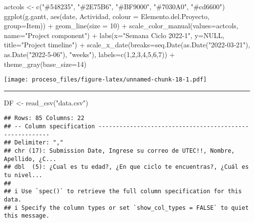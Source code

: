 \documentclass[
]{article}
\newenvironment{Shaded}{\begin{snugshade}}{\end{snugshade}}
\newcommand{\AttributeTok}[1]{\textcolor[rgb]{0.77,0.63,0.00}{#1}}
\newcommand{\ConstantTok}[1]{\textcolor[rgb]{0.00,0.00,0.00}{#1}}
\newcommand{\DecValTok}[1]{\textcolor[rgb]{0.00,0.00,0.81}{#1}}
\newcommand{\FunctionTok}[1]{\textcolor[rgb]{0.00,0.00,0.00}{#1}}
\newcommand{\NormalTok}[1]{#1}
\newcommand{\OtherTok}[1]{\textcolor[rgb]{0.56,0.35,0.01}{#1}}
\newcommand{\SpecialCharTok}[1]{\textcolor[rgb]{0.00,0.00,0.00}{#1}}
\newcommand{\StringTok}[1]{\textcolor[rgb]{0.31,0.60,0.02}{#1}}
\begin{document}
\begin{Shaded}
\begin{Highlighting}[]
\NormalTok{actcols }\OtherTok{\textless{}{-}} \FunctionTok{c}\NormalTok{(}\StringTok{"\#548235"}\NormalTok{, }\StringTok{"\#2E75B6"}\NormalTok{, }\StringTok{"\#BF9000"}\NormalTok{, }\StringTok{"\#7030A0"}\NormalTok{, }\StringTok{"\#cd6600"}\NormalTok{)}
\FunctionTok{ggplot}\NormalTok{(g.gantt, }\FunctionTok{aes}\NormalTok{(date, Actividad, }\AttributeTok{colour =}\NormalTok{ Elemento.del.Proyecto, }\AttributeTok{group=}\NormalTok{Item)) }\SpecialCharTok{+}
  \FunctionTok{geom\_line}\NormalTok{(}\AttributeTok{size =} \DecValTok{10}\NormalTok{) }\SpecialCharTok{+}
  \FunctionTok{scale\_color\_manual}\NormalTok{(}\AttributeTok{values=}\NormalTok{actcols, }\AttributeTok{name=}\StringTok{"Project component"}\NormalTok{) }\SpecialCharTok{+}
  \FunctionTok{labs}\NormalTok{(}\AttributeTok{x=}\StringTok{"Semana Ciclo 2022{-}1"}\NormalTok{, }\AttributeTok{y=}\ConstantTok{NULL}\NormalTok{, }\AttributeTok{title=}\StringTok{"Project timeline"}\NormalTok{) }\SpecialCharTok{+}
  \FunctionTok{scale\_x\_date}\NormalTok{(}\AttributeTok{breaks=}\FunctionTok{seq.Date}\NormalTok{(}\FunctionTok{as.Date}\NormalTok{(}\StringTok{"2022{-}03{-}21"}\NormalTok{), }\FunctionTok{as.Date}\NormalTok{(}\StringTok{"2022{-}5{-}06"}\NormalTok{), }\StringTok{"weeks"}\NormalTok{), }\AttributeTok{labels=}\FunctionTok{c}\NormalTok{(}\DecValTok{1}\NormalTok{,}\DecValTok{2}\NormalTok{,}\DecValTok{3}\NormalTok{,}\DecValTok{4}\NormalTok{,}\DecValTok{5}\NormalTok{,}\DecValTok{6}\NormalTok{,}\DecValTok{7}\NormalTok{)) }\SpecialCharTok{+}
  \FunctionTok{theme\_gray}\NormalTok{(}\AttributeTok{base\_size=}\DecValTok{14}\NormalTok{)}
\end{Highlighting}
\end{Shaded}

\texttt{[image: proceso\_files/figure-latex/unnamed-chunk-18-1.pdf]}

\begin{center}\rule{0.5\linewidth}{0.5pt}\end{center}

\begin{Shaded}
\begin{Highlighting}[]
\NormalTok{DF }\OtherTok{\textless{}{-}} \FunctionTok{read\_csv}\NormalTok{(}\StringTok{"data.csv"}\NormalTok{)}
\end{Highlighting}
\end{Shaded}

\begin{verbatim}
## Rows: 85 Columns: 22
## -- Column specification --------------------------------------------------------
## Delimiter: ","
## chr (17): Submission Date, Ingrese su correo de UTEC!!, Nombre, Apellido, ¿C...
## dbl  (5): ¿Cual es tu edad?, ¿En que ciclo te encuentras?, ¿Cuál es tu nivel...
## 
## i Use `spec()` to retrieve the full column specification for this data.
## i Specify the column types or set `show_col_types = FALSE` to quiet this message.
\end{verbatim}
\end{document}
